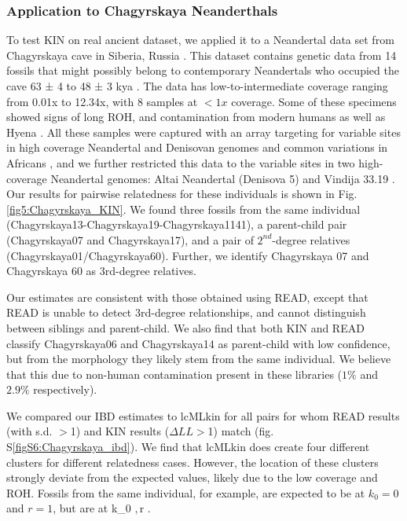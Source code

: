 \documentclass[12pt, letterpaper]{article}
\begin{document}
\subsubsection{Application to Chagyrskaya Neanderthals}
To test KIN on real ancient dataset, we applied it to a Neandertal data set  from Chagyrskaya cave in Siberia, Russia \cite{kolobova_archaeological_2020-1, mafessoni_high-coverage_2020}. This dataset contains genetic data from  14 fossils that might  possibly belong to contemporary Neandertals who occupied the cave 63 ± 4 to 48 ± 3 kya \cite{laurits_skov_genetic_nodate}. The data has low-to-intermediate coverage ranging from 0.01x to 12.34x, with 8 samples at  $<1x$ coverage. Some of these specimens showed signs of long ROH, and contamination from modern humans as well as Hyena \cite{laurits_skov_genetic_nodate}. All these samples were captured with an array targeting for variable sites in high coverage Neandertal and Denisovan genomes and common variations in Africans \cite{laurits_skov_genetic_nodate}, and we further restricted  this data to the variable sites in two high-coverage Neandertal genomes: Altai Neandertal (Denisova 5) \cite{prufer_complete_2014} and Vindija 33.19 \cite{prufer_high-coverage_2017}. Our results for pairwise relatedness for these individuals is shown in Fig.\ref{fig5:Chagyrskaya_KIN}. We found three fossils from the same  individual (Chagyrskaya13-Chagyrskaya19-Chagyrskaya1141), a parent-child pair  (Chagyrskaya07 and Chagyrskaya17), and a pair of  $2^{nd}$-degree relatives (Chagyrskaya01/Chagyrskaya60). Further, we identify   Chagyrskaya 07 and Chagyrskaya 60 as 3rd-degree relatives. 

Our estimates are consistent with those obtained using READ, except that READ is unable to detect 3rd-degree relationships, and cannot distinguish between siblings and parent-child. We also find that both  KIN and READ classify Chagyrskaya06 and Chagyrskaya14 as parent-child with low confidence, but from the morphology they likely stem from the same individual. We believe that this due to non-human contamination present in these libraries ($1\%$ and $2.9\%$ respectively).

We compared our IBD estimates to lcMLkin for all pairs for whom READ results (with s.d. $>$1) and KIN results ($\Delta LL>$1) match (fig. S\ref{figS6:Chagyrskaya_ibd}).  We find that lcMLkin does create four different clusters for different relatedness cases. However, the location of these clusters strongly deviate from the expected values, likely due to the low coverage and ROH.  Fossils from the same individual, for example, are expected to be at $k_0 = 0$ and $r = 1$, but are at k_0 $, $r .
\end{document}
